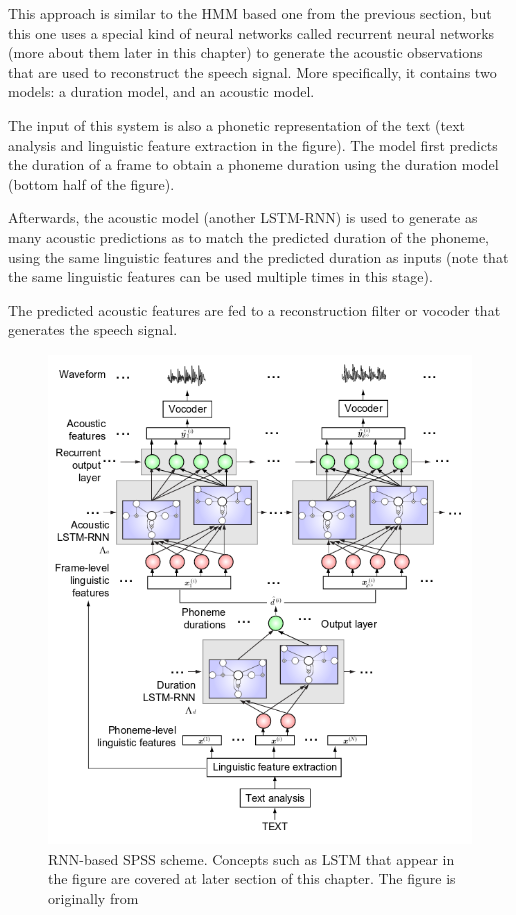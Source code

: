 This approach is similar to the HMM based one from the previous section, but this one uses a special kind of neural networks called recurrent neural networks (more about them later in this chapter) to generate the acoustic observations that are used to reconstruct the speech signal. More specifically, it contains two models: a duration model, and an acoustic model.

The input of this system is also a phonetic representation of the text (text analysis and linguistic feature extraction in the figure). The model first predicts the duration of a frame to obtain a phoneme duration using the duration model (bottom half of the figure).

Afterwards, the acoustic model (another LSTM-RNN) is used to generate as many acoustic predictions as to match the predicted duration of the phoneme, using the same linguistic features and the predicted duration as inputs (note that the same linguistic features can be used multiple times in this stage).

The predicted acoustic features are fed to a reconstruction filter or vocoder that generates the speech signal.


\begin{figure}
\centering
    \includegraphics[height=13cm]{figures/rnn-tts}
    \caption{RNN-based SPSS scheme. Concepts such as LSTM that appear in the figure are covered at later section of this chapter. The figure is originally from \cite{chen1998rnn}}
    \label{fig:rnn-tts-0}
\end{figure}

